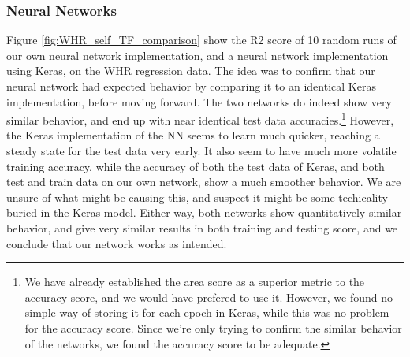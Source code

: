 \documentclass[10pt, twocolumn]{article}
\begin{document}
\subsubsection{Neural Networks}
Figure \ref{fig:WHR_self_TF_comparison} show the R2 score of 10 random runs of our own neural network implementation, and a neural network implementation using Keras, on the WHR regression data. The idea was to confirm that our neural network had expected behavior by comparing it to an identical Keras implementation, before moving forward. The two networks do indeed show very similar behavior, and end up with near identical test data accuracies.\footnote{We have already established the area score as a superior metric to the accuracy score, and we would have prefered to use it. However, we found no simple way of storing it for each epoch in Keras, while this was no problem for the accuracy score. Since we're only trying to confirm the similar behavior of the networks, we found the accuracy score to be adequate.} However, the Keras implementation of the NN seems to learn much quicker, reaching a steady state for the test data very early. It also seem to have much more volatile training accuracy, while the accuracy of both the test data of Keras, and both test and train data on our own network, show a much smoother behavior. We are unsure of what might be causing this, and suspect it might be some techicality buried in the Keras model. Either way, both networks show quantitatively similar behavior, and give very similar results in both training and testing score, and we conclude that our network works as intended.
\end{document}
